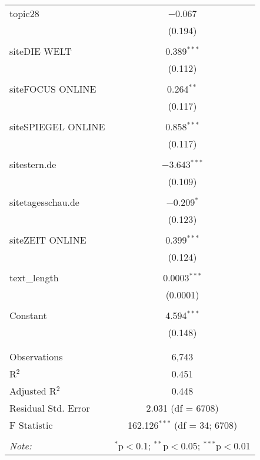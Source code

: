 \begin{table}[!htbp]
\begin{adjustbox}{totalheight=\baselineskip}
\begin{tabular}{@{\extracolsep{5pt}}lc}
 topic28 & $-$0.067 \\ 
  & (0.194) \\ 
  & \\ 
 siteDIE WELT & 0.389$^{***}$ \\ 
  & (0.112) \\ 
  & \\ 
 siteFOCUS ONLINE & 0.264$^{**}$ \\ 
  & (0.117) \\ 
  & \\ 
 siteSPIEGEL ONLINE & 0.858$^{***}$ \\ 
  & (0.117) \\ 
  & \\ 
 sitestern.de & $-$3.643$^{***}$ \\ 
  & (0.109) \\ 
  & \\ 
 sitetagesschau.de & $-$0.209$^{*}$ \\ 
  & (0.123) \\ 
  & \\ 
 siteZEIT ONLINE & 0.399$^{***}$ \\ 
  & (0.124) \\ 
  & \\ 
 text\_length & 0.0003$^{***}$ \\ 
  & (0.0001) \\ 
  & \\ 
 Constant & 4.594$^{***}$ \\ 
  & (0.148) \\ 
  & \\ 
\hline \\[-1.8ex] 
Observations & 6,743 \\ 
R$^{2}$ & 0.451 \\ 
Adjusted R$^{2}$ & 0.448 \\ 
Residual Std. Error & 2.031 (df = 6708) \\ 
F Statistic & 162.126$^{***}$ (df = 34; 6708) \\ 
\hline 
\hline \\[-1.8ex] 
\textit{Note:}  & \multicolumn{1}{r}{$^{*}$p$<$0.1; $^{**}$p$<$0.05; $^{***}$p$<$0.01} \\ 
\end{tabular}
\end{adjustbox} 
\end{table} 
